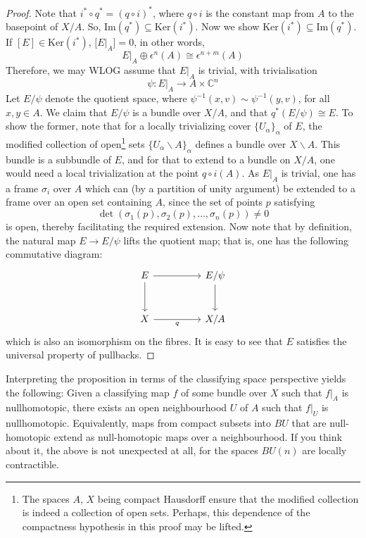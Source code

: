 \documentclass[11pt,a4paper]{article}
\begin{document}
\begin{proof}
    Note that $i^*\circ q^* = (q\circ i)^*$, where $q\circ i$ is the constant map from $A$ to the basepoint of $X/A$. So, $\text{Im}(q^*) \subseteq \text{Ker}(i^*)$. Now we show $\text{Ker}(i^*)  \subseteq \text{Im}(q^*)$. If $[E] \in \text{Ker}(i^*)$, $\big[E\big|_{A}\big] = 0$, in other words,
    $$E\big|_{A}\oplus \epsilon^n(A) \cong \epsilon^{n+m}(A)$$
    Therefore, we may WLOG assume that $E\big|_{A}$ is trivial, with trivialisation
    $$\psi: E\big|_{A} \rightarrow A\times \mathbb{C}^n$$
    Let $E/\psi$ denote the quotient space, where $\psi^{-1}(x, v) \sim \psi^{-1}(y, v)$, for all $x, y\in A$. We claim that $E/\psi$ is a bundle over $X/A$, and that $q^*(E/\psi) \cong E$. To show the former, note that for a locally trivializing cover $\{U_{\alpha}\}_{\alpha}$ of $E$, the modified collection of open\footnote{The spaces $A$, $X$ being compact Hausdorff ensure that the modified collection is indeed a collection of open sets. Perhaps, this dependence of the compactness hypothesis in this proof may be lifted.} sets $\{U_{\alpha}\backslash A\}_{\alpha}$ defines a bundle over $X\backslash A$. This bundle is a subbundle of $E$, and for that to extend to a bundle on $X/A$, one would need a local trivialization at the point $q\circ i(A)$. As $E\big|_{A}$ is trivial, one has a frame $\sigma_i$ over $A$ which can (by a partition of unity argument) be extended to a frame over an open set containing $A$, since the set of points $p$ satisfying
    $$\det(\sigma_1(p), \sigma_2(p),\ldots, \sigma_n(p)) \neq 0$$
    is open, thereby facilitating the required extension. Now note that by definition, the natural map $E\rightarrow E/\psi$ lifts the quotient map; that is, one has the following commutative diagram:
    \[\begin{tikzcd}[column sep=huge,row sep=large]
	E & {E/\psi} \\
	X & {X/A}
	\arrow["q"', from=2-1, to=2-2]
	\arrow[from=1-1, to=2-1]
	\arrow[from=1-2, to=2-2]
	\arrow[from=1-1, to=1-2]
\end{tikzcd}\]
which is also an isomorphism on the fibres. It is easy to see that $E$ satisfies the universal property of pullbacks.
\end{proof}

\begin{remark}
Interpreting the proposition in terms of the classifying space perspective yields the following: Given a classifying map $f$ of some bundle over $X$ such that $f\big|_A$ is nullhomotopic, there exists an open neighbourhood $U$ of
$A$ such that $f\big|_{U}$ is nullhomotopic. Equivalently, maps from compact subsets into $BU$ that are null-homotopic extend as null-homotopic maps over a neighbourhood. If you think about it, the above is not unexpected at all, for the spaces $BU(n)$ are locally contractible.
\end{remark}
\end{document}
